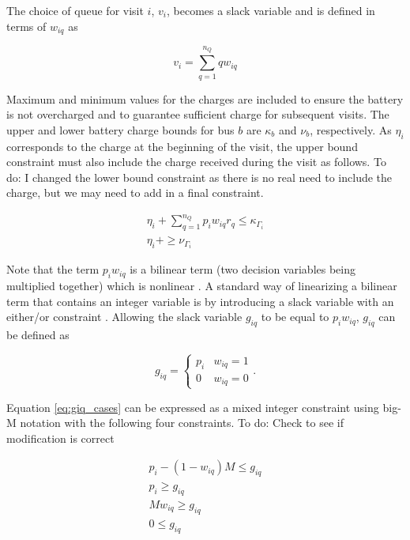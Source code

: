 \documentclass[utf8]{FrontiersinHarvard}
\newcommand{\TODO}[1]{{\color{green} To do: #1}}                                %
\begin{document}
The choice of queue for visit $i$, $v_i$, becomes a slack variable and is defined in terms of $w_{iq}$ as

\begin{equation}
    v_i = \sum_{q=1}^{n_Q} qw_{iq}
\end{equation}

Maximum and minimum values for the charges are included to ensure the battery is not overcharged and to guarantee
sufficient charge for subsequent visits. The upper and lower battery charge bounds for bus $b$ are $\kappa_b$ and $\nu_b$,
respectively. As $\eta_i$ corresponds to the charge at the beginning of the visit, the upper bound constraint must also
include the charge received during the visit as follows. \TODO{I changed the lower bound constraint as there is no real
  need to include the charge, but we may need to add in a final constraint.}

\begin{subequations}
    \label{subeq:pre_min_max}
\begin{align}
    \eta_i + \sum_{q=1}^{n_Q} p_i w_{iq} r_q \leq \kappa_{\Gamma_i}                 \\
    \eta_i + \geq \nu_{\Gamma_i}
\end{align}
\end{subequations}

Note that the term $p_i w_{iq}$ is a bilinear term (two decision variables being multiplied together) which is nonlinear
\citep{Rodriguez2013}. A standard way of linearizing a bilinear term that contains an integer variable is by introducing
a slack variable with an either/or constraint \citep{Chen2010,Rodriguez2013}. Allowing the slack variable $g_{iq}$ to be
equal to $p_i w_{iq}$, $g_{iq}$ can be defined as

\begin{equation}
    \label{eq:giq_cases}
    g_{iq} =
    \begin{cases}
        p_i & w_{iq} = 1 \\
        0 & w_{iq} = 0
    \end{cases}.
\end{equation}

Equation \eqref{eq:giq_cases} can be expressed as a mixed integer constraint using big-M notation with the following
four constraints. \TODO{Check to see if modification is correct}

\begin{subequations}
    \label{eq:slack_gain}
\begin{align}
    p_i - (1 - w_{iq})M \leq g_{iq}  \label{subeq:repgpgret} \\
    p_i \geq g_{iq}                 \label{subeq:repgples} \\
    Mw_{iq} \geq g_{iq}              \label{subeq:repgwgret} \\
    0 \leq g_{iq}                   \label{subeq:repgwles}
\end{align}
\end{subequations}
\end{document}
